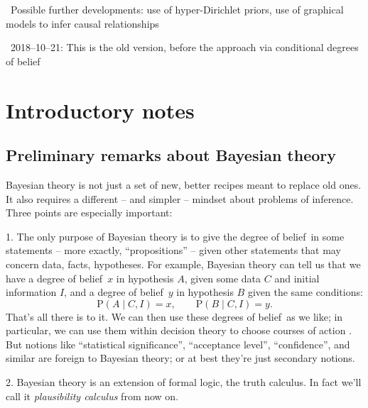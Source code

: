 \documentclass[\ifafour a4paper,12pt,\else a5paper,10pt,\fi%
onecolumn,oneside,article,%
british%
]{memoir}
\theoremstyle{remark}
\theoremstyle{innote}
\newcommand*{\citep}{\parencites}
\newcommand*{\p}{\mathrm{P}}%
\renewcommand*{\|}{\mathpunct{|}}
\newcommand*{\puzzle}{\maltese}
\newcommand{\mynote}[1]{ {\color{notecolour}\puzzle\ #1}}
\newcommand*{\dob}{degree of belief}
\newcommand*{\dobs}{degrees of belief}
\begin{document}
\mynote{Possible further developments: use of hyper-Dirichlet priors, use
  of graphical models to infer causal relationships
  \citep{pearl2000_r2009}}

\newpage
\renewcommand*{\appendixpagename}{Appendix}
\renewcommand*{\appendixname}{Appendix}
\appendix


\mynote{2018--10--21: This is the old version, before the approach via conditional \dobs}

\section{Introductory notes}
\label{sec:pre_intro}


\subsection{Preliminary remarks about Bayesian  theory}
\label{sec:pre_prelim_remarks}

Bayesian  theory is not just a set of new, better recipes meant
to replace old ones. It also requires a different -- and simpler -- mindset
about problems of inference. Three points are especially important:

1. The only purpose of Bayesian theory is to give the \dob\ in some
statements -- more exactly, \enquote{propositions}
\citep{copietal1953_r2014,barwiseetal1999_r2003} -- given other statements
that may concern data, facts, hypotheses. For example, Bayesian theory can
tell us that we have a \dob\ $x$ in hypothesis $A$, given some data $C$ and
initial information $I$, and a \dob\ $y$ in hypothesis $B$ given the same
conditions:
\begin{equation*}
  \p(A \| C, I ) = x, \qquad   \p(B \| C, I ) = y.
\end{equation*}
That's all there is to it. We can then use these \dobs\ as we like; in
particular, we can use them within decision theory to choose courses of
action \citep{raiffaetal1961_r2000,prattetal1995_r1996,soxetal1988_r2013}.
But notions like \enquote{statistical significance}, \enquote{acceptance
  level}, \enquote{confidence}, and similar are foreign to Bayesian theory;
or at best they're just secondary notions.

\medskip

2. Bayesian theory is an extension of formal logic, the truth calculus. In
fact we'll call it \emph{plausibility calculus} from now on.
\end{document}
